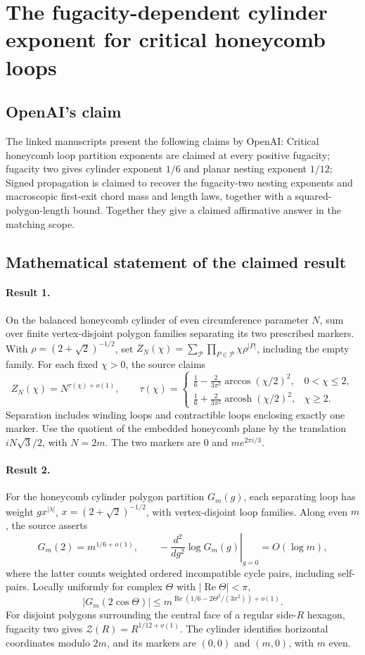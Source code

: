 \documentclass[11pt]{article}
\begin{document}
\section*{The fugacity-dependent cylinder exponent for critical honeycomb loops}

\subsection{OpenAI's claim}
The linked manuscripts present the following claims by OpenAI: Critical honeycomb loop partition exponents are claimed at every positive fugacity; fugacity two gives cylinder exponent $1/6$ and planar nesting exponent $1/12$; Signed propagation is claimed to recover the fugacity-two nesting exponents and macroscopic first-exit chord mass and length laws, together with a squared-polygon-length bound. Together they give a claimed affirmative answer in the matching scope.

\subsection{Mathematical statement of the claimed result}
\paragraph{Result 1.} On the balanced honeycomb cylinder of even circumference parameter \(N\), sum over finite vertex-disjoint polygon families separating its two prescribed markers. With \(\rho=(2+\sqrt2)^{-1/2}\), set \(Z_N(\chi)=\sum_{\mathcal P}\prod_{P\in\mathcal P}\chi\rho^{|P|}\), including the empty family. For each fixed \(\chi>0\), the source claims
\[
 Z_N(\chi)=N^{\tau(\chi)+o(1)},\qquad
 \tau(\chi)=\begin{cases}
 \frac16-\frac{2}{3\pi^2}\arccos(\chi/2)^2,&0<\chi\le2,\\
 \frac16+\frac{2}{3\pi^2}\operatorname{arcosh}(\chi/2)^2,&\chi\ge2.
 \end{cases}
\]
Separation includes winding loops and contractible loops enclosing exactly one marker. Use the quotient of the embedded honeycomb plane by the translation $iN\sqrt3/2$, with $N=2m$. The two markers are $0$ and $m e^{2\pi i/3}$.

\paragraph{Result 2.} For the honeycomb cylinder polygon partition \(G_m(g)\), each separating loop has weight \(g x^{|\lambda|}\), \(x=(2+\sqrt2)^{-1/2}\), with vertex-disjoint loop families. Along even \(m\), the source asserts
\[
 G_m(2)=m^{1/6+o(1)},\qquad
 -\left.\frac{d^2}{dg^2}\log G_m(g)\right|_{g=0}=O(\log m),
\]
where the latter counts weighted ordered incompatible cycle pairs, including self-pairs. Locally uniformly for complex \(\Theta\) with \(|\operatorname{Re}\Theta|<\pi\),
\[
 |G_m(2\cos\Theta)|\le m^{\operatorname{Re}(1/6-2\Theta^2/(3\pi^2))+o(1)}.
\]
For disjoint polygons surrounding the central face of a regular side-\(R\) hexagon, fugacity two gives \(\mathcal Z(R)=R^{1/12+o(1)}\). The cylinder identifies horizontal coordinates modulo $2m$, and its markers are $(0,0)$ and $(m,0)$, with $m$ even.
\end{document}
